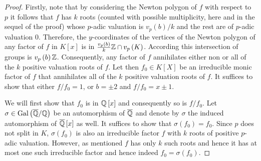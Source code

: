 \documentclass[../main.tex]{subfiles}
\begin{document}
\begin{proof}
  Firstly, note that by considering the Newton polygon of $f$ with respect to $p$ it follows that $f$ has $k$ roots (counted with possible multiplicity, here and in the sequel of the proof) whose $p$-adic valuation is $v_p\left( b \right) / k$ and the rest are of $p$-adic valuation $0$.
  Therefore, the $y$-coordinates of the vertices of the Newton polygon of any factor of $f$ in $K\left[ x \right]$ is in $\frac{v_p\left( b \right)}{k} \mathbb{Z} \cap v_p\left( K \right)$. 
  According  this intersection of groups is $v_p\left( b \right)\mathbb{Z}$.
  Consequently, any factor of $f$ annihilates either non or all of the $k$ positive valuation roots of $f$.
  Let then $f_0 \in K\left[ X \right]$ be an irreducible monic factor of $f$ that annihilates all of the $k$ positive valuation roots of $f$.
  It suffices to show that either $f / f_0 = 1$, or $b = \pm 2$ and $f / f_0 = x \pm 1$.
  

  We will first show that $f_0$ is in $\mathbb{Q}\left[ x \right]$ and consequently so is $f / f_0$.
  Let $\sigma \in \operatorname{Gal}\left( \overline{\mathbb{Q}}/ \mathbb{Q} \right)$ be an automorphism of $\overline{\mathbb{Q}}$ and denote by $\sigma$ the induced automorphism of $\overline{\mathbb{Q}}\left[ x \right]$ as well.
  It suffices to show that $\sigma\left( f_0 \right) = f_0$.
  Since $p$ does not split in $K$, $\sigma\left( f_0 \right)$ is also an irreducible factor $f$ with $k$ roots of positive $p$-adic valuation. 
  However, as mentioned $f$ has only $k$ such roots and hence it has at most one such irreducible factor and hence indeed $f_0 = \sigma\left( f_0 \right)$.


\end{proof}
\end{document}
